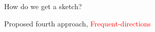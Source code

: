 \documentclass[first=dgreen,second=purple,logo=redque]{aaltoslides}
\newcommand{\vectornorm}[1]{\left\|#1\right\|}
\begin{document}
\begin{frame}[allowframebreaks=1]{How do we get a sketch?}
\begin{itemize}
\end{itemize}

%  
%

Proposed fourth approach, \textcolor{red}{Frequent-directions}
\end{frame}
\end{document}
